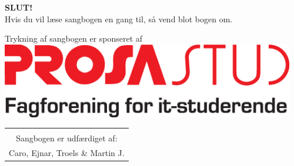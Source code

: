 \newpage

\begin{center}
{\Huge \textbf{SLUT!}}\\
\vspace{6cm}
{\large Hvis du vil læse sangbogen en gang til, så vend blot bogen
  om.}\\

\vspace{3cm}

{\large Trykning af sangbogen er sponseret af}
\includegraphics[width=0.96\textwidth]{res/prosalogo.eps}


\begin{tabular}{c}
\vspace{3cm}
\\
Sangbogen er udfærdiget af:\\
Caro, Ejnar, Troels \& Martin J.
\end{tabular}
\end{center}
